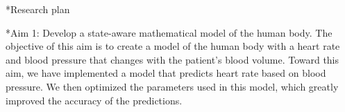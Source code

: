 \documentclass[11pt]{article}
\makeatletter
\renewcommand\subsection{\@startsection
	{subsection}{2}{0mm}
	{-0.05in}
	{-0.5\baselineskip}
	{\normalfont\normalsize\bfseries}}
\renewcommand\section{\@startsection
	{subsection}{2}{0mm}
	{-0.2in}
	{0.05\baselineskip}
	{\normalfont\large\bfseries}}
\makeatother
\begin{document}

\section*{Research plan}

\subsection*{Aim 1: Develop a state-aware mathematical model of the human body.}
The objective of this aim is to create a model of the human body with a heart rate and blood pressure that changes with the patient's blood volume. Toward this aim, we have implemented a model that predicts heart rate based on blood pressure. We then optimized the parameters used in this model, which greatly improved the accuracy of the predictions.
\end{document}
